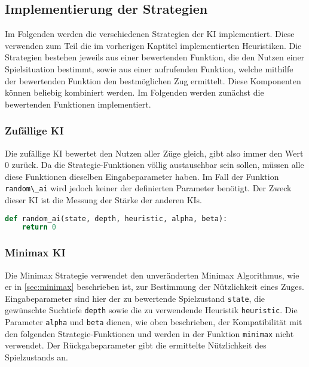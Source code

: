 \hypertarget{implementierung-der-strategien}{%
\subsection{Implementierung der
Strategien}\label{implementierung-der-strategien}}

Im Folgenden werden die verschiedenen Strategien der \ac{KI}
implementiert. Diese verwenden zum Teil die im vorherigen Kaptitel
implementierten Heuristiken. Die Strategien bestehen jeweils aus einer
bewertenden Funktion, die den Nutzen einer Spielsituation bestimmt,
sowie aus einer aufrufenden Funktion, welche mithilfe der bewertenden
Funktion den bestmöglichen Zug ermittelt. Diese Komponenten können
beliebig kombiniert werden. Im Folgenden werden zunächst die bewertenden
Funktionen implementiert.

\hypertarget{zufuxe4llige-ki}{%
\subsubsection{Zufällige KI}\label{zufuxe4llige-ki}}

Die zufällige \ac{KI} bewertet den Nutzen aller Züge gleich, gibt also
immer den Wert \(0\) zurück. Da die Strategie-Funktionen völlig
austauschbar sein sollen, müssen alle diese Funktionen dieselben
Eingabeparameter haben. Im Fall der Funktion
\passthrough{\lstinline!random\_ai!} wird jedoch keiner der definierten
Parameter benötigt. Der Zweck dieser \ac{KI} ist die Messung der Stärke
der anderen \acp{KI}.

\begin{lstlisting}[language=Python]
def random_ai(state, depth, heuristic, alpha, beta):
    return 0
\end{lstlisting}

\hypertarget{minimax-ki}{%
\subsubsection{Minimax KI}\label{minimax-ki}}

Die Minimax Strategie verwendet den unveränderten Minimax Algorithmus,
wie er in \autoref{sec:minimax} beschrieben ist, zur Bestimmung der
Nützlichkeit eines Zuges. Eingabeparameter sind hier der zu bewertende
Spielzustand \passthrough{\lstinline!state!}, die gewünschte Suchtiefe
\passthrough{\lstinline!depth!} sowie die zu verwendende Heuristik
\passthrough{\lstinline!heuristic!}. Die Parameter
\passthrough{\lstinline!alpha!} und \passthrough{\lstinline!beta!}
dienen, wie oben beschrieben, der Kompatibilität mit den folgenden
Strategie-Funktionen und werden in der Funktion
\passthrough{\lstinline!minimax!} nicht verwendet. Der Rückgabeparameter
gibt die ermittelte Nützlichkeit des Spielzustands an.


